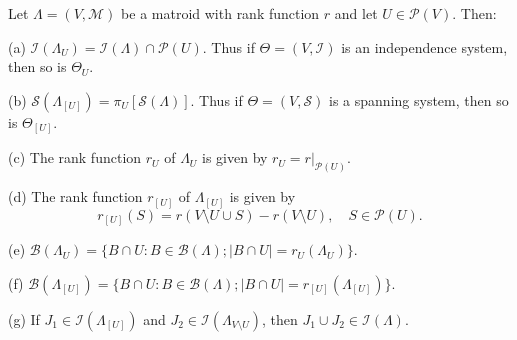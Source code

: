 Let $\Lambda = (V, \mathcal{M})$ be a matroid with rank function $r$ and let $U \in \mathcal{P}(V)$. Then:

(a) $\mathcal{I}(\Lambda_U) = \mathcal{I}(\Lambda) \cap \mathcal{P}(U)$. Thus if $\Theta = (V, \mathcal{I})$ is an independence system, then so is $\Theta_U$.

(b) $\mathcal{S}(\Lambda_{[U]}) = \pi_U[\mathcal{S}(\Lambda)]$. Thus if $\Theta = (V, \mathcal{S})$ is a spanning system, then so is $\Theta_{[U]}$.

(c) The rank function $r_U$ of $\Lambda_U$ is given by $r_U = r|_{\mathcal{P}(U)}$.

(d) The rank function $r_{[U]}$ of $\Lambda_{[U]}$ is given by
$$r_{[U]}(S) = r(V \setminus U \cup S) - r(V \setminus U), \quad S \in \mathcal{P}(U).$$

(e) $\mathcal{B}(\Lambda_U) = \{B \cap U: B \in \mathcal{B}(\Lambda); |B \cap U| = r_U(\Lambda_U)\}$.

(f) $\mathcal{B}(\Lambda_{[U]}) = \{B \cap U: B \in \mathcal{B}(\Lambda); |B \cap U| = r_{[U]}(\Lambda_{[U]})\}$.

(g) If $J_1 \in \mathcal{I}(\Lambda_{[U]})$ and $J_2 \in \mathcal{I}(\Lambda_{V \setminus U})$, then $J_1 \cup J_2 \in \mathcal{I}(\Lambda)$.
